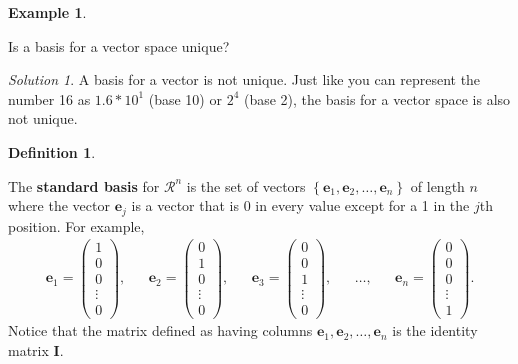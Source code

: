 \documentclass[
]{book}
\theoremstyle{definition}
\newtheorem{definition}{Definition}[chapter]
\theoremstyle{definition}
\newtheorem{example}{Example}[chapter]
\theoremstyle{definition}
\theoremstyle{remark}
\newtheorem*{solution}{Solution}
\begin{document}
\begin{example}
\protect\hypertarget{exm:unlabeled-div-86}{}\label{exm:unlabeled-div-86}

Is a basis for a vector space unique?

\end{example}

\begin{solution}

A basis for a vector is not unique. Just like you can represent the number 16 as \(1.6 * 10^1\) (base 10) or \(2^4\) (base 2), the basis for a vector space is also not unique.

\end{solution}

\begin{definition}
\protect\hypertarget{def:standard-basis}{}\label{def:standard-basis}

The \textbf{standard basis} for \(\mathcal{R}^n\) is the set of vectors \(\left\{ \mathbf{e}_1, \mathbf{e}_2, \ldots, \mathbf{e}_n \right\}\) of length \(n\) where the vector \(\mathbf{e}_j\) is a vector that is 0 in every value except for a 1 in the \(j\)th position. For example,
\[
\begin{aligned}
\mathbf{e}_1 = \begin{pmatrix} 1 \\ 0 \\ 0 \\ \vdots \\ 0 \end{pmatrix}, && \mathbf{e}_2 = \begin{pmatrix} 0 \\ 1 \\ 0 \\ \vdots \\ 0 \end{pmatrix}, && \mathbf{e}_3 = \begin{pmatrix} 0 \\ 0 \\ 1 \\ \vdots \\ 0\end{pmatrix}, && \ldots, && \mathbf{e}_n = \begin{pmatrix} 0 \\ 0 \\ 0 \\ \vdots \\ 1 \end{pmatrix}.
\end{aligned}
\]
Notice that the matrix defined as having columns \(\mathbf{e}_1, \mathbf{e}_2, \ldots, \mathbf{e}_n\) is the identity matrix \(\mathbf{I}\).

\end{definition}
\end{document}
